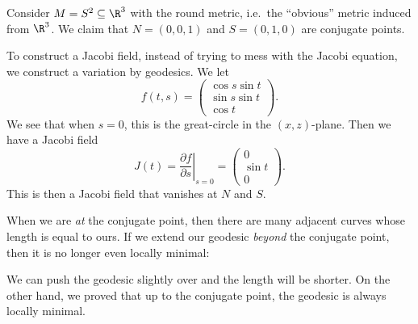 \documentclass[a4paper]{article}
\begin{document}
\begin{eg}
  Consider $M = S^2 \subseteq \R^3$ with the round metric, i.e.\ the ``obvious'' metric induced from $\R^3$. We claim that $N = (0, 0, 1)$ and $S = (0, 1, 0)$ are conjugate points.

  To construct a Jacobi field, instead of trying to mess with the Jacobi equation, we construct a variation by geodesics. We let
  \[
    f(t, s) =
    \begin{pmatrix}
      \cos s \sin t\\
      \sin s \sin t\\
      \cos t
    \end{pmatrix}.
  \]
  We see that when $s = 0$, this is the great-circle in the $(x, z)$-plane. Then we have a Jacobi field
  \[
    J(t) = \left.\frac{\partial f}{\partial s}\right|_{s = 0} =
    \begin{pmatrix}
      0\\
      \sin t\\
      0
    \end{pmatrix}.
  \]
  This is then a Jacobi field that vanishes at $N$ and $S$.
  \begin{center}
  \end{center}
\end{eg}
When we are \emph{at} the conjugate point, then there are many adjacent curves whose length is equal to ours. If we extend our geodesic \emph{beyond} the conjugate point, then it is no longer even locally minimal:
\begin{center}
\end{center}
We can push the geodesic slightly over and the length will be shorter. On the other hand, we proved that up to the conjugate point, the geodesic is always locally minimal.
\end{document}
